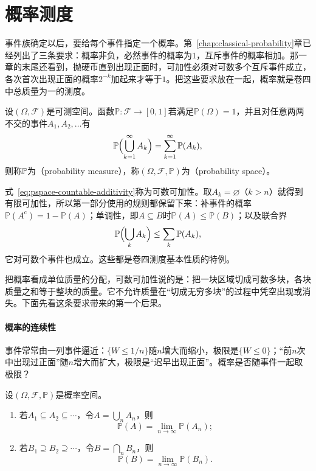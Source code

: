 \section{概率测度}
\label{sec:pspace-measures}

事件族确定以后，要给每个事件指定一个概率。第~\ref{chap:classical-probability}章已经列出了三条要求：概率非负，必然事件的概率为$1$，互斥事件的概率相加。那一章的末尾还看到，抛硬币直到出现正面时，可加性必须对可数多个互斥事件成立，各次首次出现正面的概率$2^{-k}$加起来才等于$1$。把这些要求放在一起，概率就是卷四中总质量为一的测度。

\begin{definition}[概率测度与概率空间]
\label{def:pspace-probability-space}
设$(\Omega,\mathcal{F})$是可测空间。函数$\mathbb{P}:\mathcal{F}\to[0,1]$若满足$\mathbb{P}(\Omega)=1$，并且对任意两两不交的事件$A_1,A_2,\dots$有
\begin{equation}
  \mathbb{P}\Bigl(\bigcup_{k=1}^{\infty}A_k\Bigr)=\sum_{k=1}^{\infty}\mathbb{P}(A_k),
  \label{eq:pspace-countable-additivity}
\end{equation}
则称$\mathbb{P}$为（probability measure），称$(\Omega,\mathcal{F},\mathbb{P})$为（probability space）。
\end{definition}

式~\eqref{eq:pspace-countable-additivity}称为可数可加性。取$A_k=\varnothing$（$k>n$）就得到有限可加性，所以第一部分使用的规则都保留下来：补事件的概率$\mathbb{P}(A^{\mathrm{c}})=1-\mathbb{P}(A)$；单调性，即$A\subseteq B$时$\mathbb{P}(A)\leq\mathbb{P}(B)$；以及联合界
\[
  \mathbb{P}\Bigl(\bigcup_kA_k\Bigr)\leq\sum_k\mathbb{P}(A_k),
\]
它对可数个事件也成立。这些都是卷四测度基本性质的特例。

把概率看成单位质量的分配，可数可加性说的是：把一块区域切成可数多块，各块质量之和等于整块的质量。它不允许质量在“切成无穷多块”的过程中凭空出现或消失。下面先看这条要求带来的第一个后果。

\paragraph{概率的连续性}
事件常常由一列事件逼近：$\{W\leq1/n\}$随$n$增大而缩小，极限是$\{W\leq0\}$；“前$n$次中出现过正面”随$n$增大而扩大，极限是“迟早出现正面”。概率是否随事件一起取极限？

\begin{theorem}[概率的连续性]
\label{thm:pspace-continuity}
设$(\Omega,\mathcal{F},\mathbb{P})$是概率空间。
\begin{enumerate}
  \item 若$A_1\subseteq A_2\subseteq\cdots$，令$A=\bigcup_nA_n$，则
  \begin{equation}
    \mathbb{P}(A)=\lim_{n\to\infty}\mathbb{P}(A_n);
    \label{eq:pspace-continuity-up}
  \end{equation}
  \item 若$B_1\supseteq B_2\supseteq\cdots$，令$B=\bigcap_nB_n$，则
  \begin{equation}
    \mathbb{P}(B)=\lim_{n\to\infty}\mathbb{P}(B_n).
    \label{eq:pspace-continuity-down}
  \end{equation}
\end{enumerate}
\end{theorem}

